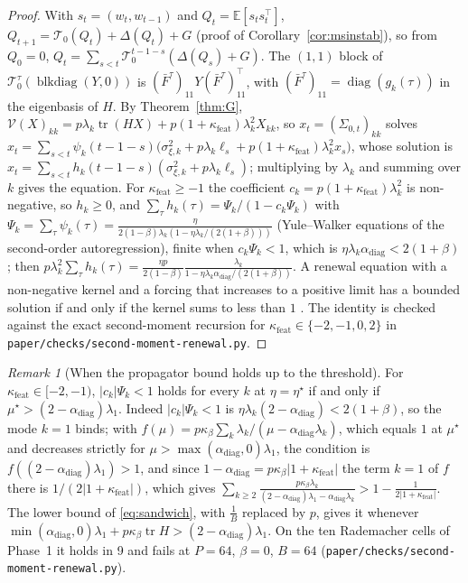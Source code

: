 \documentclass[11pt]{article}
\theoremstyle{remark}
\newtheorem{remark}[theorem]{Remark}
\newcommand{\E}{\mathbb{E}}
\newcommand{\tr}{\operatorname{tr}}
\begin{document}
\begin{proof}
With $s_t=(w_t,w_{t-1})$ and $Q_t=\E[s_ts_t^\top]$, $Q_{t+1}=\mathcal T_0(Q_t)+\Delta(Q_t)+G$ (proof of Corollary~\ref{cor:msinstab}), so from $Q_0=0$, $Q_t=\sum_{s<t}\mathcal T_0^{t-1-s}(\Delta(Q_s)+G)$. The $(1,1)$ block of $\mathcal T_0^\tau(\operatorname{blkdiag}(Y,0))$ is $(\bar F^\tau)_{11}Y(\bar F^\tau)_{11}^\top$, with $(\bar F^\tau)_{11}=\operatorname{diag}(g_k(\tau))$ in the eigenbasis of $H$. By Theorem~\ref{thm:G}, $\mathcal V(X)_{kk}=p\lambda_k\tr(HX)+p(1+\kappa_{\mathrm{feat}})\lambda_k^2X_{kk}$, so $x_t=(\Sigma_{0,t})_{kk}$ solves $x_t=\sum_{s<t}\psi_k(t-1-s)\big(\sigma_{\xi,k}^2+p\lambda_k\ell_s+p(1+\kappa_{\mathrm{feat}})\lambda_k^2x_s\big)$, whose solution is $x_t=\sum_{s<t}h_k(t-1-s)(\sigma_{\xi,k}^2+p\lambda_k\ell_s)$; multiplying by $\lambda_k$ and summing over $k$ gives the equation. For $\kappa_{\mathrm{feat}}\ge-1$ the coefficient $c_k=p(1+\kappa_{\mathrm{feat}})\lambda_k^2$ is non-negative, so $h_k\ge0$, and $\sum_\tau h_k(\tau)=\Psi_k/(1-c_k\Psi_k)$ with $\Psi_k=\sum_\tau\psi_k(\tau)=\frac{\eta}{2(1-\beta)\lambda_k(1-\eta\lambda_k/(2(1+\beta)))}$ (Yule--Walker equations of the second-order autoregression), finite when $c_k\Psi_k<1$, which is $\eta\lambda_k\alpha_{\mathrm{diag}}<2(1+\beta)$; then $p\lambda_k^2\sum_\tau h_k(\tau)=\frac{\eta p}{2(1-\beta)}\frac{\lambda_k}{1-\eta\lambda_k\alpha_{\mathrm{diag}}/(2(1+\beta))}$. A renewal equation with a non-negative kernel and a forcing that increases to a positive limit has a bounded solution if and only if the kernel sums to less than $1$ \citep[Chapter~V]{asmussen2003}. The identity is checked against the exact second-moment recursion for $\kappa_{\mathrm{feat}}\in\{-2,-1,0,2\}$ in \texttt{paper/checks/second-moment-renewal.py}.
\end{proof}
\begin{remark}[When the propagator bound holds up to the threshold]\label{rem:renewal-rademacher}
For $\kappa_{\mathrm{feat}}\in[-2,-1)$, $|c_k|\Psi_k<1$ holds for every $k$ at $\eta=\eta^\star$ if and only if $\mu^\star>(2-\alpha_{\mathrm{diag}})\lambda_1$. Indeed $|c_k|\Psi_k<1$ is $\eta\lambda_k(2-\alpha_{\mathrm{diag}})<2(1+\beta)$, so the mode $k=1$ binds; with $f(\mu)=p\kappa_\beta\sum_k\lambda_k/(\mu-\alpha_{\mathrm{diag}}\lambda_k)$, which equals $1$ at $\mu^\star$ and decreases strictly for $\mu>\max(\alpha_{\mathrm{diag}},0)\lambda_1$, the condition is $f((2-\alpha_{\mathrm{diag}})\lambda_1)>1$, and since $1-\alpha_{\mathrm{diag}}=p\kappa_\beta|1+\kappa_{\mathrm{feat}}|$ the term $k=1$ of $f$ there is $1/(2|1+\kappa_{\mathrm{feat}}|)$, which gives $\sum_{k\ge2}\frac{p\kappa_\beta\lambda_k}{(2-\alpha_{\mathrm{diag}})\lambda_1-\alpha_{\mathrm{diag}}\lambda_k}>1-\frac1{2|1+\kappa_{\mathrm{feat}}|}$. The lower bound of \eqref{eq:sandwich}, with $\frac1B$ replaced by $p$, gives it whenever $\min(\alpha_{\mathrm{diag}},0)\lambda_1+p\kappa_\beta\tr H>(2-\alpha_{\mathrm{diag}})\lambda_1$. On the ten Rademacher cells of Phase~1 it holds in 9 and fails at $P=64$, $\beta=0$, $B=64$ (\texttt{paper/checks/second-moment-renewal.py}).
\end{remark}
\end{document}
